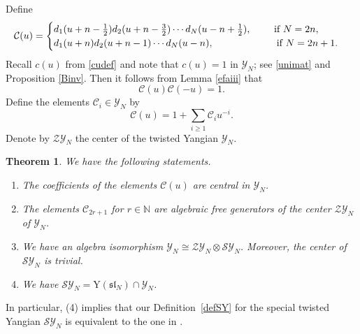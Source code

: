 \documentclass[11pt,reqno]{amsart}
\numberwithin{equation}{section}
\newtheorem{thm}{Theorem}[section]
\theoremstyle{definition}
\theoremstyle{remark}
\newcommand{\beq}{\begin{equation}}
\newcommand{\eeq}{\end{equation}}
\newcommand{\bN}{\mathbb{N}}
\newcommand{\rY}{\mathrm{Y}}
\newcommand{\gge}{\geqslant}
\newcommand{\Y}{{\mathscr{Y}}}
\newcommand{\SY}{{\mathscr{SY}}}
\begin{document}
Define
\beq\label{cu}
\mathcal C(u)=\begin{cases}
d_1(u+n-\tfrac12)d_2(u+n-\tfrac32)\cdots d_N(u-n+\tfrac12),\qquad \text{ if }N=2n,\\
d_1(u+n)d_2(u+n-1)\cdots  d_N(u-n),\qquad \hskip 1.45cm \text{ if }N=2n+1.
\end{cases}
\eeq
Recall $c(u)$ from \eqref{cudef} and note that $c(u)=1$ in $\Y_N$; see \eqref{unimat} and Proposition \ref{Binv}. Then it follows from Lemma \ref{efaiii} that
\beq\label{cu-sym}
\mathcal C(u)\mathcal C(-u)=1.
\eeq
Define the elements $\mathcal C_i\in\Y_N$ by
\[
\mathcal C(u)=1+\sum_{i\gge 1}\mathcal C_iu^{-i}.
\]
Denote by $\mathscr{ZY}_N$ the center of the twisted Yangian $\Y_N$. 
\begin{thm}\label{thm:center}
We have the following statements.
\begin{enumerate}
    \item The coefficients of the elements $\mathcal C(u)$ are central in $\Y_N$.
    \item The elements $\mathcal C_{2r+1}$ for $r\in\bN$ are algebraic free generators of the center $\mathscr{ZY}_N$ of $\Y_N$.
    \item We have an algebra isomorphism $\Y_N\cong \mathscr{ZY}_N\otimes \SY_N$. Moreover, the center of $\SY_N$ is trivial.
    \item We have $\SY_N=\rY(\mathfrak{sl}_N)\cap \Y_N$.
\end{enumerate}
\end{thm}

In particular, (4) implies that our Definition~\ref{defSY} for the special twisted Yangian $\SY_N$ is equivalent to the one in \cite[Def. 2.9.1]{Mol07}.
\end{document}
